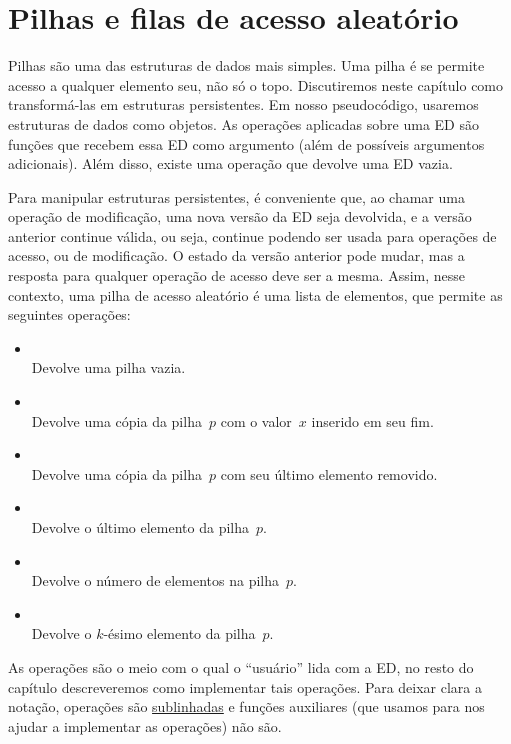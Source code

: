 \documentclass[main.tex]{subfiles}
\begin{document}
\chapter{Pilhas e filas de acesso aleatório} \label{cap:pilha_persist}
Pilhas são uma das estruturas de dados mais simples. Uma pilha é  se permite acesso a qualquer elemento seu, não só o topo. Discutiremos neste capítulo como transformá-las em estruturas persistentes. Em nosso pseudocódigo, usaremos estruturas de dados como objetos. As operações aplicadas sobre uma ED são funções que recebem essa ED como argumento (além de possíveis argumentos adicionais). Além disso, existe uma operação que devolve uma ED vazia.

Para manipular estruturas persistentes, é conveniente que, ao chamar uma operação de modificação, uma nova versão da ED seja devolvida, e a versão anterior continue válida, ou seja, continue podendo ser usada para operações de acesso, ou de modificação. O estado da versão anterior pode mudar, mas a resposta para qualquer operação de acesso deve ser a mesma. Assim, nesse contexto, uma pilha de acesso aleatório é uma lista de elementos, que permite as seguintes operações:

\begin{itemize}
	\item {}
		\\ Devolve uma pilha vazia.
	\item {}
		\\ Devolve uma cópia da pilha~$p$ com o valor~$x$ inserido em seu fim.
	\item {}
		\\ Devolve uma cópia da pilha~$p$ com seu último elemento removido.
	\item {}
		\\ Devolve o último elemento da pilha~$p$.
	\item {}
		\\ Devolve o número de elementos na pilha~$p$.
	\item {}
		\\ Devolve o $k$-ésimo elemento da pilha~$p$.
\end{itemize}

As operações são o meio com o qual o ``usuário'' lida com a ED, no resto do capítulo descreveremos como implementar tais operações. Para deixar clara a notação, operações são \underline{sublinhadas} e funções auxiliares (que usamos para nos ajudar a implementar as operações) não são.
\end{document}
